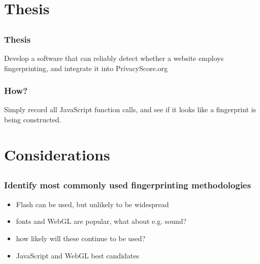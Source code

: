 \documentclass{beamer}
\begin{document}

\section{Thesis}
\subsection{}


\begin{frame}
    \frametitle{Thesis}
    Develop a software that can reliably detect whether a website employs fingerprinting,
    and integrate it into PrivacyScore.org
\end{frame}


\begin{frame}
    \frametitle{How?}
    Simply record all JavaScript function calls, and see if it looks like a fingerprint is being
    constructed.
\end{frame}


\section{Considerations}
\subsection{}


\begin{frame}
    \frametitle{Identify most commonly used fingerprinting methodologies}
    \begin{itemize}
        \item Flash can be used, but unlikely to be widespread
        \item fonts and WebGL are popular, what about e.g. sound?
        \item how likely will these continue to be used?
        \item JavaScript and WebGL best candidates
    \end{itemize}
\end{frame}

\end{document}
